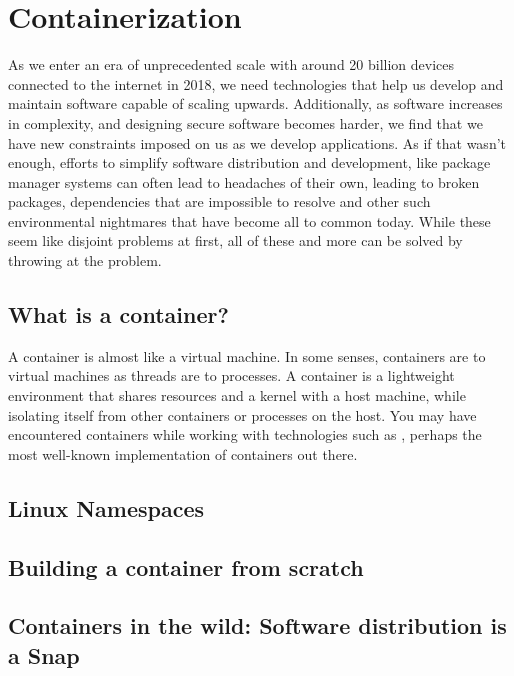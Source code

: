 \section{Containerization}
As we enter an era of unprecedented scale with around 20 billion devices
connected to the internet in 2018, we need technologies that help us develop and
maintain software capable of scaling upwards. Additionally, as software increases
in complexity, and designing secure software becomes harder, we find that we
have new constraints imposed on us as we develop applications. As if that wasn't
enough, efforts to simplify software distribution and development, like package
manager systems can often lead to headaches of their own, leading to broken
packages, dependencies that are impossible to resolve and other such
environmental nightmares that have become all to common today. While these seem
like disjoint problems at first, all of these and more can be solved by throwing
 at the problem.

\subsection{What is a container?}
A container is almost like a virtual machine.
In some senses, containers are to virtual machines as threads are to processes.
A container is a lightweight environment that shares resources and a kernel with
a host machine, while isolating itself from other containers or processes on the
host. You may have encountered containers while working with technologies such
as , perhaps the most well-known implementation of containers
out there.

\subsection{Linux Namespaces}

\subsection{Building a container from scratch}

\subsection{Containers in the wild: Software distribution is a Snap}
